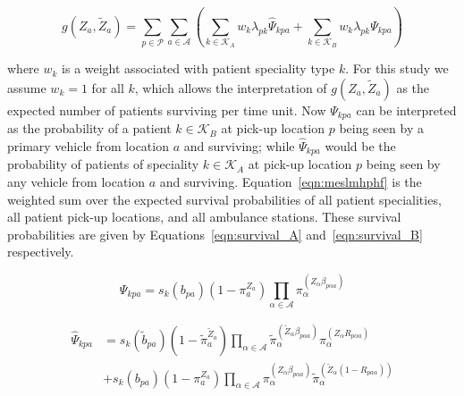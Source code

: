 \documentclass[numbers,webpdf,imaman]{ima-authoring-template}%
\begin{document}
\begin{equation}\label{eqn:meslmhphf}
g\left(Z_a, \tilde{Z}_a\right) =
\sum_{p \in \mathcal{P}} \sum_{a \in \mathcal{A}}
\left( \sum_{k \in \mathcal{K}_A}  w_k \lambda_{pk} \hat{\Psi}_{kpa} +
\sum_{k \in \mathcal{K}_B}  w_k \lambda_{pk} \Psi_{kpa} \right)
\end{equation}

\noindent
where $w_k$ is a weight associated with patient speciality type $k$. For this
study we assume $w_k = 1$ for all $k$, which allows the interpretation of
$g\left(Z_a, \tilde{Z}_a\right)$ as the expected number of patients surviving
per time unit. Now $\Psi_{kpa}$ can be interpreted as
the probability of a patient $k \in \mathcal{K}_B$ at pick-up location $p$
being seen by a primary vehicle from location $a$ and surviving; while
$\hat{\Psi}_{kpa}$ would be the probability of patients of speciality
$k \in \mathcal{K}_A$ at pick-up location $p$ being seen by any vehicle from
location $a$ and surviving. Equation~\ref{eqn:meslmhphf} is the weighted sum
over the expected survival probabilities of all patient specialities, all
patient pick-up locations, and all ambulance stations. These survival
probabilities are given by Equations~\ref{eqn:survival_A}
and~\ref{eqn:survival_B} respectively.

\begin{equation}\label{eqn:survival_A}
\Psi_{kpa} = s_k\left( b_{pa} \right)
\left(1 - \pi_{a}^{Z_a} \right)
\prod_{\alpha \in \mathcal{A}}
\pi_{\alpha}^{\left(Z_{\alpha} \beta_{p\alpha a} \right)}
\end{equation}

\begin{align}\label{eqn:survival_B}
\hat{\Psi}_{kpa} &= s_k\left(\tilde{b}_{pa}\right)
\left(1 - \tilde{\pi}_{a}^{\tilde{Z}_a} \right)
\prod_{\alpha \in \mathcal{A}}
\tilde{\pi}_{\alpha}^{\left(\tilde{Z}_{\alpha} \beta_{p\alpha a}\right)}
\pi_{\alpha}^{\left(Z_{\alpha} R_{p \alpha a}\right) } \nonumber \\
&+ s_k\left(b_{pa}\right) \left(1 - \pi_{a}^{Z_a} \right)
\prod_{\alpha \in \mathcal{A}}
\pi_{\alpha}^{\left(Z_{\alpha}\beta_{p\alpha a}\right)}
\tilde{\pi}_{\alpha}^{\left(\tilde{Z}_{\alpha}
\left(1 - R _{p a\alpha}\right)\right)}
\end{align}
\end{document}
